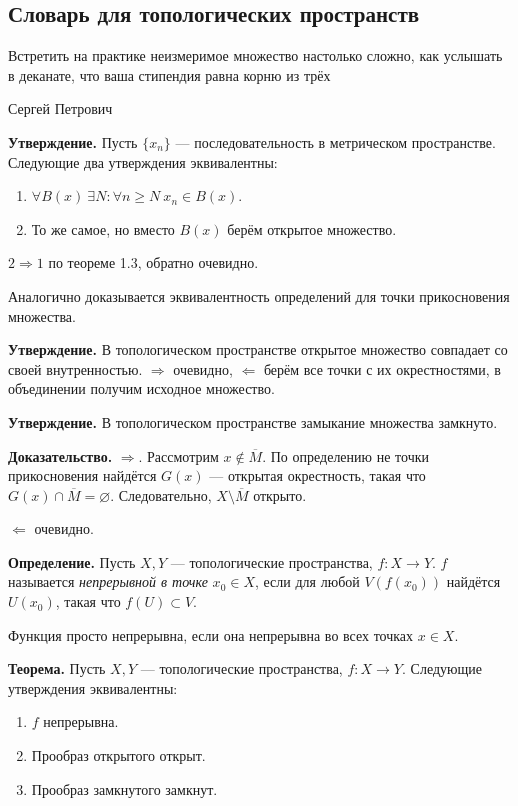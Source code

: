 \subsection{Словарь для топологических пространств}
\epigraph{Встретить на практике неизмеримое множество настолько сложно, как услышать в деканате, что ваша стипендия равна корню из трёх}{Сергей Петрович}

\textbf{Утверждение.} Пусть $\{x_n\}$ --- последовательность в метрическом пространстве.
Следующие два утверждения эквивалентны:
\begin{enumerate}
    \item $\forall B(x)~\exists N: \forall n \ge N~x_n \in B(x)$.
    \item То же самое, но вместо $B(x)$ берём открытое множество.
\end{enumerate}
$2 \Rightarrow 1$ по теореме 1.3, обратно очевидно.

Аналогично доказывается эквивалентность определений для точки прикосновения множества.

\textbf{Утверждение.} В топологическом пространстве открытое множество совпадает со своей внутренностью.
$\Rightarrow$ очевидно, $\Leftarrow$ берём все точки с их окрестностями, в объединении получим исходное множество.

\textbf{Утверждение.} В топологическом пространстве замыкание множества замкнуто.

\textbf{Доказательство.} $\Rightarrow$. Рассмотрим $x \not\in \overline M$.
По определению не точки прикосновения найдётся $G(x)$ --- открытая окрестность, такая что $G(x) \cap \overline M = \varnothing$.
Следовательно, $X \setminus \overline M$ открыто.

$\Leftarrow$ очевидно.

\QED

\textbf{Определение.} Пусть $X, Y$ --- топологические пространства, $f: X \to Y$.
$f$ называется \textit{непрерывной в точке} $x_0 \in X$, если для любой $V(f(x_0))$ найдётся $U(x_0)$, такая что $f(U) \subset V$.

Функция просто непрерывна, если она непрерывна во всех точках $x \in X$.

\textbf{Теорема.} Пусть $X, Y$ --- топологические пространства, $f: X \to Y$.
Следующие утверждения эквивалентны:
\begin{enumerate}
    \item $f$ непрерывна.
    \item Прообраз открытого открыт.
    \item Прообраз замкнутого замкнут.
\end{enumerate}

